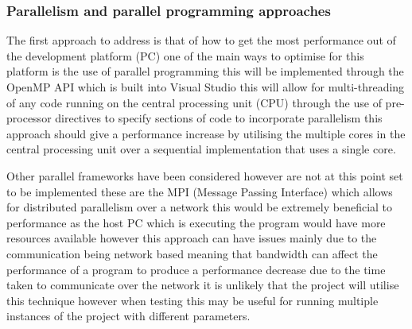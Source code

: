 \subsubsection{Parallelism and parallel programming approaches}
The first approach to address is that of how to get the most performance out of the development platform (PC) one of the main ways to optimise for this platform is the use of parallel programming this will be implemented through the OpenMP API \cite{Openmp}which is built into Visual Studio this will allow for multi-threading of any code running on the central processing unit (CPU) through the use of pre-processor directives to specify sections of code to incorporate parallelism this approach should give a performance increase by utilising the multiple cores in the central processing unit over a sequential implementation that uses a single core.

Other parallel frameworks have been considered however are not at this point set to be implemented these are the MPI (Message Passing Interface)\cite{mpi} which allows for distributed parallelism over a network this would be extremely beneficial to performance as the host PC which is executing the program would have more resources available however this approach can have issues mainly due to the communication being network based meaning that bandwidth can affect the performance of a program to produce a performance decrease due to the time taken to communicate over the network it is unlikely that the project will utilise this technique however when testing this may be useful for running multiple instances of the project with different parameters. 

